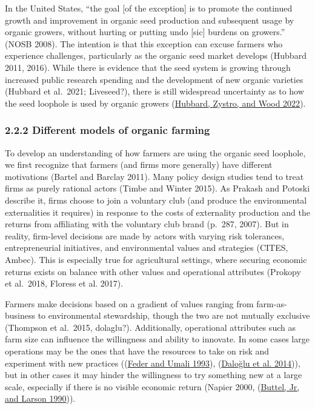 \documentclass[twoside,12pt,final]{ucthesis-CA2012}
\begin{document}
\begin{ucmainmatter}
In the United States, ``the goal {[}of the exception{]} is to promote the
continued growth and improvement in organic seed production and
subsequent usage by organic growers, without hurting or putting undo
{[}sic{]} burdens on growers.'' (NOSB 2008). The intention is that this
exception can excuse farmers who experience challenges, particularly as
the organic seed market develops (Hubbard 2011, 2016). While there is
evidence that the seed system is growing through increased public
research spending and the development of new organic varieties (Hubbard
et al.~2021; Liveseed?), there is still widespread uncertainty as to how
the seed loophole is used by organic growers
(\protect\hyperlink{ref-Hubbard_Zystro_Wood_2022}{Hubbard, Zystro, and Wood 2022}).

\hypertarget{different-models-of-organic-farming}{%
\subsubsection{2.2.2 Different models of organic farming}\label{different-models-of-organic-farming}}

To develop an understanding of how farmers are using the organic seed
loophole, we first recognize that farmers (and firms more generally)
have different motivations (Bartel and Barclay 2011). Many policy design
studies tend to treat firms as purely rational actors (Timbe and Winter
2015). As Prakash and Potoski describe it, \textquotesingle firms choose to join a
voluntary club (and produce the environmental externalities it requires)
in response to the costs of externality production and the returns from
affiliating with the voluntary club brand\textquotesingle{} (p.~287, 2007). But in
reality, firm-level decisions are made by actors with varying risk
tolerances, entrepreneurial initiatives, and environmental values and
strategies (CITES, Ambec). This is especially true for agricultural
settings, where securing economic returns exists on balance with other
values and operational attributes (Prokopy et al.~2018, Floress et al.
2017).

Farmers make decisions based on a gradient of values ranging from
\textquotesingle farm-as-business\textquotesingle{} to \textquotesingle environmental stewardship\textquotesingle, though the two
are not mutually exclusive (Thompson et al.~2015, dolaglu?).
Additionally, operational attributes such as farm size can influence the
willingness and ability to innovate. In some cases large operations may
be the ones that have the resources to take on risk and experiment with
new practices
((\protect\hyperlink{ref-Feder_Umali_1993}{Feder and Umali 1993}),
(\protect\hyperlink{ref-Daloux11flu_Nassauer_Riolo_Scavia_2014}{Daloğlu et al. 2014})),
but in other cases it may hinder the willingness to try something new at
a large scale, especially if there is no visible economic return (Napier
2000,
(\protect\hyperlink{ref-Buttel_Jr_Larson_1990}{Buttel, Jr, and Larson 1990})).


\end{ucmainmatter}
\end{document}
